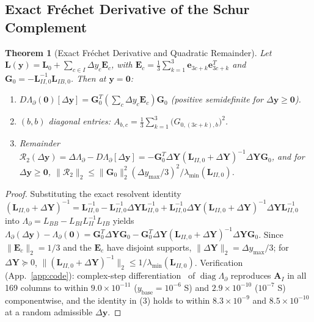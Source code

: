 \documentclass[11pt,a4paper]{article}
\newtheorem{theorem}{Theorem}[section]
\theoremstyle{definition}
\theoremstyle{remark}
\begin{document}
\subsection{Exact Fréchet Derivative of the Schur Complement}
\begin{theorem}[Exact Fréchet Derivative and Quadratic Remainder]\label{thm:frechet}
Let $\mathbf{L}(\mathbf{y}) = \mathbf{L}_0 + \sum_{c\in I}\Delta y_c \mathbf{E}_c$, with $\mathbf{E}_c = \tfrac{1}{3}\sum_{k=1}^3\mathbf{e}_{3c+k}\mathbf{e}_{3c+k}^T$ and $\mathbf{G}_0 = -\mathbf{L}_{II,0}^{-1}\mathbf{L}_{IB,0}$. Then at $\mathbf{y}=\mathbf{0}$:
\begin{enumerate}
\item $D\Lambda_\partial(\mathbf{0})[\Delta\mathbf{y}] = \mathbf{G}_0^T\left(\sum_c \Delta y_c \mathbf{E}_c\right)\mathbf{G}_0$ (positive semidefinite for $\Delta\mathbf{y}\ge\mathbf{0}$).
\item $(b,b)$ diagonal entries: $A_{b,c} = \frac{1}{3}\sum_{k=1}^3 \big(G_{0,(3c+k),b}\big)^2$.
\item Remainder $\mathcal{R}_2(\Delta\mathbf{y}) = \Delta\Lambda_\partial - D\Lambda_\partial[\Delta\mathbf{y}] = -\mathbf{G}_0^T \Delta\mathbf{Y}(\mathbf{L}_{II,0}+\Delta\mathbf{Y})^{-1}\Delta\mathbf{Y}\mathbf{G}_0$, and for $\Delta\mathbf{y}\ge\mathbf{0}$, $\|\mathcal{R}_2\|_2 \le \|\mathbf{G}_0\|_2^2 (\Delta y_{\max}/3)^2 / \lambda_{\min}(\mathbf{L}_{II,0})$.
\end{enumerate}
\end{theorem}
\begin{proof}
Substituting the exact resolvent identity $(\mathbf{L}_{II,0}+\Delta\mathbf{Y})^{-1} = \mathbf{L}_{II,0}^{-1} - \mathbf{L}_{II,0}^{-1}\Delta\mathbf{Y}\mathbf{L}_{II,0}^{-1} + \mathbf{L}_{II,0}^{-1}\Delta\mathbf{Y}(\mathbf{L}_{II,0}+\Delta\mathbf{Y})^{-1}\Delta\mathbf{Y}\mathbf{L}_{II,0}^{-1}$ into $\Lambda_\partial = L_{BB} - L_{BI}L_{II}^{-1}L_{IB}$ yields $\Lambda_\partial(\Delta\mathbf{y}) - \Lambda_\partial(\mathbf{0}) = \mathbf{G}_0^T\Delta\mathbf{Y}\mathbf{G}_0 - \mathbf{G}_0^T\Delta\mathbf{Y}(\mathbf{L}_{II,0}+\Delta\mathbf{Y})^{-1}\Delta\mathbf{Y}\mathbf{G}_0$. Since $\|\mathbf{E}_c\|_2 = 1/3$ and the $\mathbf{E}_c$ have disjoint supports, $\|\Delta\mathbf{Y}\|_2 = \Delta y_{\max}/3$; for $\Delta\mathbf{Y}\succeq0$, $\|(\mathbf{L}_{II,0}+\Delta\mathbf{Y})^{-1}\|_2 \le 1/\lambda_{\min}(\mathbf{L}_{II,0})$. Verification (App.~\ref{app:code}): complex-step differentiation~\cite{squire1998} of $\operatorname{diag}\Lambda_\partial$ reproduces $\mathbf{A}_I$ in all 169 columns to within $9.0\times10^{-11}$ ($y_{\text{base}} = 10^{-6}$ S) and $2.9\times10^{-10}$ ($10^{-7}$ S) componentwise, and the identity in (3) holds to within $8.3\times10^{-9}$ and $8.5\times10^{-10}$ at a random admissible $\Delta\mathbf{y}$.
\end{proof}
\end{document}
